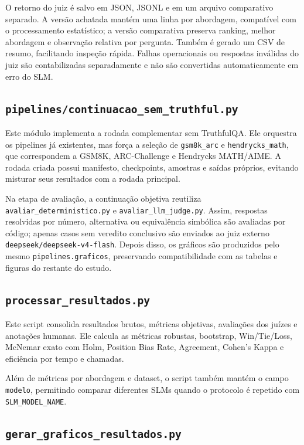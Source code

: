 \documentclass[12pt]{article}
\begin{document}
O retorno do juiz é salvo em JSON, JSONL e em um arquivo comparativo separado. A versão achatada mantém uma linha por abordagem, compatível com o processamento estatístico; a versão comparativa preserva ranking, melhor abordagem e observação relativa por pergunta. Também é gerado um CSV de resumo, facilitando inspeção rápida. Falhas operacionais ou respostas inválidas do juiz são contabilizadas separadamente e não são convertidas automaticamente em erro do SLM.

\subsection{\texttt{pipelines/continuacao\_sem\_truthful.py}}

Este módulo implementa a rodada complementar sem TruthfulQA. Ele orquestra os pipelines já existentes, mas força a seleção de \texttt{gsm8k\_arc} e \texttt{hendrycks\_math}, que correspondem a GSM8K, ARC-Challenge e Hendrycks MATH/AIME. A rodada criada possui manifesto, checkpoints, amostras e saídas próprios, evitando misturar seus resultados com a rodada principal.

Na etapa de avaliação, a continuação objetiva reutiliza \texttt{avaliar\_deterministico.py} e \texttt{avaliar\_llm\_judge.py}. Assim, respostas resolvidas por número, alternativa ou equivalência simbólica são avaliadas por código; apenas casos sem veredito conclusivo são enviados ao juiz externo \texttt{deepseek/deepseek-v4-flash}. Depois disso, os gráficos são produzidos pelo mesmo \texttt{pipelines.graficos}, preservando compatibilidade com as tabelas e figuras do restante do estudo.

\subsection{\texttt{processar\_resultados.py}}

Este script consolida resultados brutos, métricas objetivas, avaliações dos juízes e anotações humanas. Ele calcula as métricas robustas, bootstrap, Win/Tie/Loss, McNemar exato com Holm, Position Bias Rate, Agreement, Cohen's Kappa e eficiência por tempo e chamadas.

Além de métricas por abordagem e dataset, o script também mantém o campo \texttt{modelo}, permitindo comparar diferentes SLMs quando o protocolo é repetido com \texttt{SLM\_MODEL\_NAME}.

\subsection{\texttt{gerar\_graficos\_resultados.py}}
\end{document}
